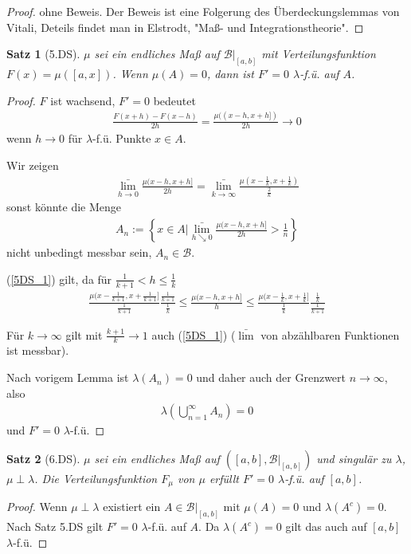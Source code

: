 \documentclass[]{article}
\newtheorem{theorem}{Satz}
\begin{document}
\begin{proof}
	ohne Beweis. Der Beweis ist eine Folgerung des Überdeckungslemmas von Vitali, Deteils findet man in Elstrodt, "Maß- und Integrationstheorie".
\end{proof}

\begin{theorem}[5.DS]
	$\mu$ sei ein endliches Maß auf $\mathcal{B}|_{[a,b]}$ mit Verteilungsfunktion $F(x)=\mu([a,x])$. Wenn $\mu(A)=0$, dann ist $F'=0$ $\lambda$-f.ü. auf $A$.
\end{theorem}
\begin{proof}
	$F$ ist wachsend, $F'=0$ bedeutet
	\begin{align*}
		\frac{F(x+h)-F(x-h)}{2h} = \frac{\mu((x-h,x+h])}{2h} \rightarrow 0
	\end{align*}
	wenn $h\rightarrow0$ für $\lambda$-f.ü. Punkte $x\in A$.
	
	Wir zeigen
	\begin{align}
		\label{5DS_1}
		\bar{\lim\limits_{h\rightarrow0}} \frac{\mu(x-h,x+h]}{2h} = \bar{\lim\limits_{k\rightarrow\infty}} \frac{\mu(x-\frac{1}{k}, x+\frac{1}{k})}{\frac{2}{k}}
	\end{align}
	sonst könnte die Menge
	\begin{align*}
		A_n := \left\{ x\in A \big| \bar{\lim\limits_{h\searrow0}} \frac{\mu(x-h,x+h]}{2h} > \frac{1}{n} \right\}
	\end{align*}
	nicht unbedingt messbar sein, $A_n \in \mathcal{B}$.
	
	(\ref{5DS_1}) gilt, da für $\frac{1}{k+1} < h \leq \frac{1}{k}$
	\begin{align*}
		\frac{\mu(x-\frac{1}{k+1}, x+\frac{1}{k+1}]}{\frac{1}{k+1}} \frac{\frac{1}{k+1}}{\frac{1}{k}} \leq \frac{\mu(x-h,x+h]}{h} \leq \frac{\mu(x-\frac{1}{k}, x+\frac{1}{k}]}{\frac{1}{k}} \frac{\frac{1}{k}}{\frac{1}{k+1}}
	\end{align*}

	Für $k\rightarrow\infty$ gilt mit $\frac{k+1}{k}\rightarrow 1$ auch (\ref{5DS_1}) ($\bar{\lim}$ von abzählbaren Funktionen ist messbar).
	
	Nach vorigem Lemma ist $\lambda(A_n) = 0$ und daher auch der Grenzwert $n \rightarrow \infty$, also
	\begin{align*}
		\lambda\left(\bigcup_{n=1}^{\infty} A_n \right) = 0
	\end{align*}
	und $F'=0$ $\lambda$-f.ü.
\end{proof}

\begin{theorem}[6.DS]
	$\mu$ sei ein endliches Maß auf $([a,b], \mathcal{B}|_{[a,b]})$ und singulär zu $\lambda$, $\mu \perp \lambda$. Die Verteilungsfunktion $F_\mu$ von $\mu$ erfüllt $F'=0$ $\lambda$-f.ü. auf $[a,b]$.
\end{theorem}
\begin{proof}
	Wenn $\mu \perp \lambda$ existiert ein $A \in \mathcal{B}|_{[a,b]}$ mit $\mu(A) = 0$ und $\lambda(A^c) = 0$. Nach Satz 5.DS gilt $F'=0$ $\lambda$-f.ü. auf $A$. Da $\lambda(A^c) = 0$ gilt das auch auf $[a,b]$ $\lambda$-f.ü.
\end{proof}
\end{document}
